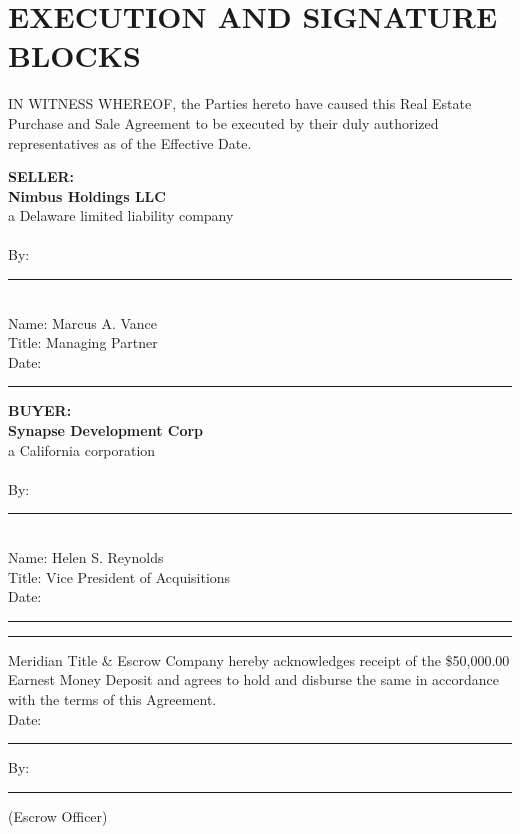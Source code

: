 \section{EXECUTION AND SIGNATURE BLOCKS}

\noindent
IN WITNESS WHEREOF, the Parties hereto have caused this Real Estate Purchase and Sale Agreement to be executed by their duly authorized representatives as of the Effective Date.

\vspace{30pt}

\noindent
\begin{minipage}[t]{0.48\textwidth}
    \textbf{SELLER:} \\
    \textbf{Nimbus Holdings LLC} \\
    a Delaware limited liability company \\
    \vspace{40pt} \\
    By: \rule{2.2in}{0.5pt} \\
    Name: Marcus A. Vance \\
    Title: Managing Partner \\
    Date: \rule{2.2in}{0.5pt}
\end{minipage}
\hfill
\begin{minipage}[t]{0.48\textwidth}
    \textbf{BUYER:} \\
    \textbf{Synapse Development Corp} \\
    a California corporation \\
    \vspace{40pt} \\
    By: \rule{2.2in}{0.5pt} \\
    Name: Helen S. Reynolds \\
    Title: Vice President of Acquisitions \\
    Date: \rule{2.2in}{0.5pt}
\end{minipage}

\vspace{50pt}
\noindent
\rule{\textwidth}{0.5pt}
\vspace{10pt}
\begin{center}
    \color{lawteal}\sffamily\footnotesize
    Meridian Title \& Escrow Company hereby acknowledges receipt of the \$50,000.00 Earnest Money Deposit and agrees to hold and disburse the same in accordance with the terms of this Agreement.\\
    Date: \rule{1.5in}{0.5pt} \hfill By: \rule{2.2in}{0.5pt} (Escrow Officer)
\end{center}
